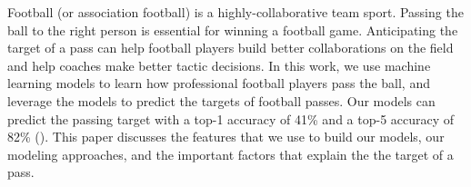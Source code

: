 Football (or association football) is a highly-collaborative team sport. 
Passing the ball to the right person is essential for winning a football game.
Anticipating the target of a pass can help football players build better collaborations on the field and help coaches make better tactic decisions.
In this work, we use machine learning models to learn how professional football players pass the ball, and leverage the models to predict the targets of football passes.
Our models can predict the passing target with a top-1 accuracy of 41\% and a top-5 accuracy of 82\% ().
This paper discusses the features that we use to build our models, our modeling approaches, and the important factors that explain the the target of a pass.
